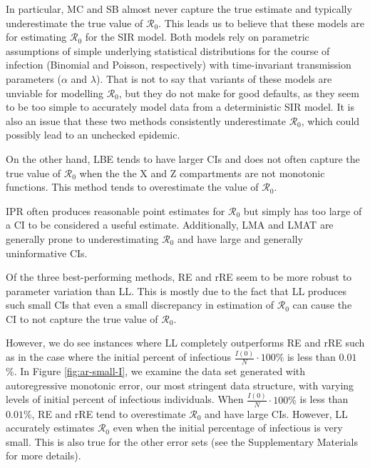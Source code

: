 \documentclass[12pt]{article}
\newcommand{\rr}{\ensuremath{\mathcal{R}_0}}
\begin{document}
In particular, MC and SB almost never capture the true estimate and typically underestimate the true value of $\rr$.  This leads us to believe that these models are for estimating $\rr$ for the SIR model.  Both models rely on parametric assumptions of simple underlying statistical distributions for the course of infection (Binomial and Poisson, respectively) with time-invariant transmission parameters ($\alpha$ and $\lambda$).   That is not to say that variants of these models are unviable for modelling $\rr$, but they do not make for good defaults, as they seem to be too simple to accurately model data from a deterministic SIR model.  It is also an issue that these two methods consistently underestimate $\rr$, which could possibly lead to an unchecked epidemic.

On the other hand, LBE tends to have larger CIs and does not often capture the true value of $\rr$ when the the X and Z compartments are not monotonic functions.  This method tends to overestimate the value of $\rr$.

IPR often produces reasonable point estimates for $\rr$ but simply has too large of a CI to be considered a useful estimate.    Additionally, LMA and LMAT are generally prone to underestimating $\rr$ and have large and generally uninformative CIs.

Of the three best-performing methods, RE and rRE seem to be  more robust to parameter variation than LL.  This is mostly due to the fact that LL produces such small CIs that even a small discrepancy in estimation of $\rr$ can cause the CI to not capture the true value of $\rr$.

However, we do see instances where LL completely outperforms RE and rRE such as in the case where the initial percent of infectious $\frac{I(0)}{N} \cdot 100\%$ is less than $0.01$\%. In Figure \ref{fig:ar-small-I}, we examine the data set generated with autoregressive monotonic error, our most stringent data structure, with varying levels of initial percent of infectious individuals.  When $\frac{I(0)}{N} \cdot 100\%$ is less than $ 0.01$\%, RE and rRE tend to overestimate $\rr$ and have large CIs.  However, LL accurately estimates $\rr$ even when the initial percentage of infectious is very small.  This is also true for the other error sets (see the Supplementary Materials for more details).
\end{document}
